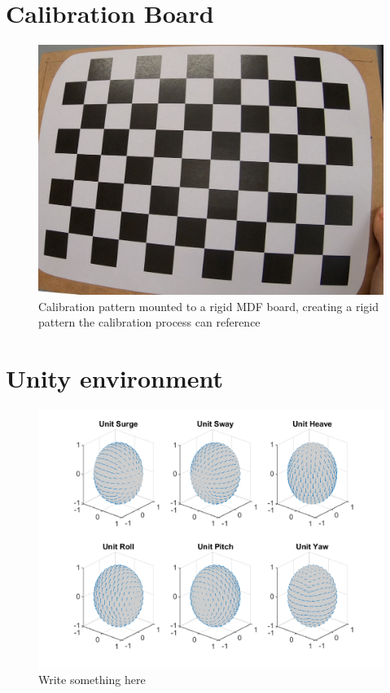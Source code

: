 \documentclass{UoNMCHA}
\numberwithin{equation}{section}
\begin{document}
\section{Calibration Board}\label{app:calibrationBoard}
\begin{figure}[ht]
    \begin{center}
        \includegraphics[width=.6\linewidth]{Figures/calibrationBoard}%
        \caption{Calibration pattern mounted to a rigid MDF board, creating a rigid pattern the calibration process can reference}
        \label{fig:UnityEnvironment}
    \end{center}
\end{figure}
\newpage
\section{Unity environment}\label{app:unityEnvironment}
\begin{figure}[ht]
    \begin{center}
        \includegraphics[width=.6\linewidth]{Figures/Unit_Movement}%
        \caption{Write something here}
        \label{fig:UnityEnvironment}
    \end{center}
\end{figure}
\end{document}
